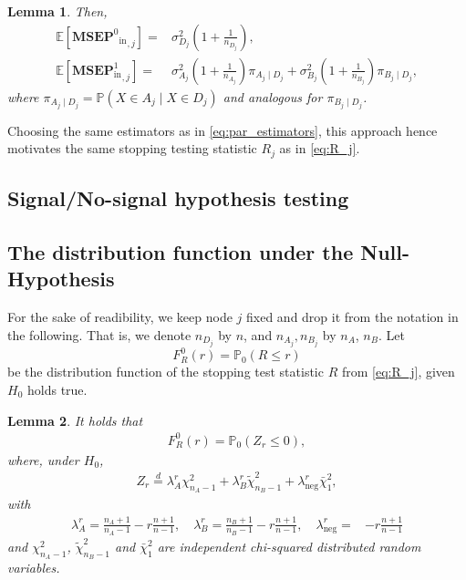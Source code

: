\documentclass[11pt,a4paper]{article}
\newtheorem{lemma}{Lemma}
\renewcommand{\P}{\operatorname{P}}
\newcommand{\E }{\mathbb{E}}  %
\renewcommand{\P}{\mathbb{P}}  %
\newcommand{\MSEPOin}{{\textbf{MSEP}^0}_{\text{in}}}
\newcommand{\MSEPIin}{\textbf{MSEP}^1_{\text{in}}}
\newcommand{\eqdis}{\stackrel{d}{=}}
\begin{document}

\begin{lemma}\label{lem:mot2}
Then,
\begin{align*}
\E[{\MSEPOin}_{,j}]
 = &\sigma_{D_j}^2\left(1 + \frac{1}{n_{D_j}}\right), \\
\E[{\MSEPIin}_{,j}] =  &\sigma_{A_j}^2\left(1 + \frac{1}{n_{A_j}}\right)\pi_{A_j \mid D_j} + \sigma_{B_j}^2\left(1 + \frac{1}{n_{B_j}}\right)\pi_{B_j \mid D_j},
\end{align*}
where $\pi_{A_j\mid D_j} = \P(X \in A_j \mid X \in D_j)$ and analogous for $\pi_{B_j \mid D_j}$.
\end{lemma}
Choosing the same estimators as in \eqref{eq:par_estimators}, this approach hence motivates the same stopping testing statistic $R_j$ as in \eqref{eq:R_j}.




\subsection{Signal/No-signal hypothesis testing}


\subsection{The distribution function under the Null-Hypothesis}
For the sake of readibility, we keep node $j$ fixed and drop it from the notation in the following. That is, we denote $n_{D_j}$ by $n$, and $n_{A_j}, n_{B_j}$ by $n_A$, $n_B$. Let
$$
F^0_R(r) = \P_0(R \leq r)
$$
be the distribution function of the stopping test statistic $R$ from \eqref{eq:R_j}, given $H_0$ holds true.
\begin{lemma}
It holds that
\begin{align*}
F_R^0(r) = \P_0(Z_r \leq 0), 
\end{align*}
where, under $H_0$,
\begin{align}\label{eq:Z_r}
	Z_r \eqdis
	\lambda_A^r \chi^2_{n_A -1}
	+ \lambda_B^r \tilde \chi^2_{n_B -1}
	+ \lambda_{\text{neg}}^r \bar \chi_1^2,
\end{align}
with
\begin{align*}
	\lambda_A^r =             \frac{n_A +1}{n_A -1} - r\frac{n+1}{n-1}, \quad 
		\lambda_B^r =             \frac{n_B +1}{n_B -1} - r\frac{n+1}{n-1}, \quad
	\lambda_{\text{neg}}^r = & -r\frac{n+1}{n-1}
\end{align*}
and $\chi^2_{n_A -1}$, $\tilde \chi^2_{n_B -1}$ and $\bar \chi_1^2$ are independent chi-squared distributed random variables.
\end{lemma}
\end{document}
